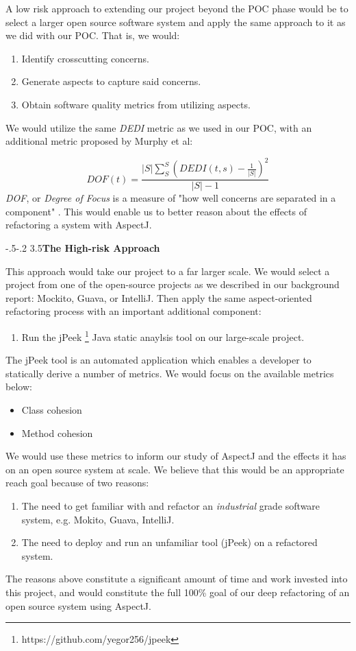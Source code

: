 \documentclass[sigconf]{acmart}
\makeatletter
\def\subsubsection{\@startsection{subsubsection}{3}{10pt}%
                                 {-.5\baselineskip \@plus -2\p@ \@minus -.2\p@}%
                 {3.5\p@}{\subsubsectionfont}}
\makeatother
\begin{document}
A low risk approach to extending our project beyond the POC phase would be to select a larger open source software system and apply the same approach to it as we did with our POC. That is, we would:
\begin{enumerate}
    \item Identify crosscutting concerns.
    \item Generate aspects to capture said concerns.
    \item Obtain software quality metrics from utilizing aspects.
\end{enumerate}
We would utilize the same \textit{DEDI} metric as we used in our POC, with an additional metric proposed by Murphy et al:

$$DOF(t) = \frac{|S| \sum_S^S(DEDI(t,s) - \frac{1}{|S|})^2}{|S| - 1}$$
\textit{DOF}, or \textit{Degree of Focus} is a measure of "how well concerns are separated in a component" \cite{murphy}. This would enable us to better reason about the effects of refactoring a system with AspectJ.

\subsubsection{\textbf{The High-risk Approach}}

This approach would take our project to a far larger scale. We would select a project from one of the open-source projects as we described in our background report: Mockito, Guava, or IntelliJ. Then apply the same aspect-oriented refactoring process with an important additional component:
\begin{enumerate}
    \item Run the jPeek \footnote{https://github.com/yegor256/jpeek} Java static anaylsis tool on our large-scale project.
\end{enumerate}
The jPeek tool is an automated application which enables a developer to statically derive a number of metrics. We would focus on the available metrics below:
\begin{itemize}
    \item Class cohesion
    \item Method cohesion
\end{itemize}
We would use these metrics to inform our study of AspectJ and the effects it has on an open source system at scale. We believe that this would be an appropriate reach goal because of two reasons:
\begin{enumerate}
    \item The need to get familiar with and refactor an \textit{industrial} grade software system, e.g. Mokito, Guava, IntelliJ.
    \item The need to deploy and run an unfamiliar tool (jPeek) on a refactored system.
\end{enumerate}
The reasons above constitute a significant amount of time and work invested into this project, and would constitute the full 100\% goal of our deep refactoring of an open source system using AspectJ.
\end{document}
